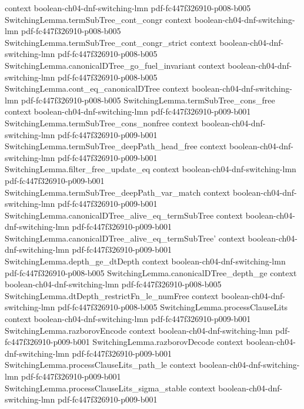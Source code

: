 \begin{theorem}
  {context}
  {boolean-ch04-dnf-switching-lmn}
  {pdf-fc447f326910-p008-b005}
\proofstep
  {SwitchingLemma.termSubTree_cont_congr}
  {context}
  {boolean-ch04-dnf-switching-lmn}
  {pdf-fc447f326910-p008-b005}
\proofstep
  {SwitchingLemma.termSubTree_cont_congr_strict}
  {context}
  {boolean-ch04-dnf-switching-lmn}
  {pdf-fc447f326910-p008-b005}
\proofstep
  {SwitchingLemma.canonicalDTree_go_fuel_invariant}
  {context}
  {boolean-ch04-dnf-switching-lmn}
  {pdf-fc447f326910-p008-b005}
\proofstep
  {SwitchingLemma.cont_eq_canonicalDTree}
  {context}
  {boolean-ch04-dnf-switching-lmn}
  {pdf-fc447f326910-p008-b005}
\proofstep
  {SwitchingLemma.termSubTree_cons_free}
  {context}
  {boolean-ch04-dnf-switching-lmn}
  {pdf-fc447f326910-p009-b001}
\proofstep
  {SwitchingLemma.termSubTree_cons_nonfree}
  {context}
  {boolean-ch04-dnf-switching-lmn}
  {pdf-fc447f326910-p009-b001}
\proofstep
  {SwitchingLemma.termSubTree_deepPath_head_free}
  {context}
  {boolean-ch04-dnf-switching-lmn}
  {pdf-fc447f326910-p009-b001}
\proofstep
  {SwitchingLemma.filter_free_update_eq}
  {context}
  {boolean-ch04-dnf-switching-lmn}
  {pdf-fc447f326910-p009-b001}
\proofstep
  {SwitchingLemma.termSubTree_deepPath_var_match}
  {context}
  {boolean-ch04-dnf-switching-lmn}
  {pdf-fc447f326910-p009-b001}
\proofstep
  {SwitchingLemma.canonicalDTree_alive_eq_termSubTree}
  {context}
  {boolean-ch04-dnf-switching-lmn}
  {pdf-fc447f326910-p009-b001}
\proofstep
  {SwitchingLemma.canonicalDTree_alive_eq_termSubTree'}
  {context}
  {boolean-ch04-dnf-switching-lmn}
  {pdf-fc447f326910-p009-b001}
\proofstep
  {SwitchingLemma.depth_ge_dtDepth}
  {context}
  {boolean-ch04-dnf-switching-lmn}
  {pdf-fc447f326910-p008-b005}
\proofstep
  {SwitchingLemma.canonicalDTree_depth_ge}
  {context}
  {boolean-ch04-dnf-switching-lmn}
  {pdf-fc447f326910-p008-b005}
\proofstep
  {SwitchingLemma.dtDepth_restrictFn_le_numFree}
  {context}
  {boolean-ch04-dnf-switching-lmn}
  {pdf-fc447f326910-p008-b005}
\proofstep
  {SwitchingLemma.processClauseLits}
  {context}
  {boolean-ch04-dnf-switching-lmn}
  {pdf-fc447f326910-p009-b001}
\proofstep
  {SwitchingLemma.razborovEncode}
  {context}
  {boolean-ch04-dnf-switching-lmn}
  {pdf-fc447f326910-p009-b001}
\proofstep
  {SwitchingLemma.razborovDecode}
  {context}
  {boolean-ch04-dnf-switching-lmn}
  {pdf-fc447f326910-p009-b001}
\proofstep
  {SwitchingLemma.processClauseLits_path_le}
  {context}
  {boolean-ch04-dnf-switching-lmn}
  {pdf-fc447f326910-p009-b001}
\proofstep
  {SwitchingLemma.processClauseLits_sigma_stable}
  {context}
  {boolean-ch04-dnf-switching-lmn}
  {pdf-fc447f326910-p009-b001}

\end{theorem}
